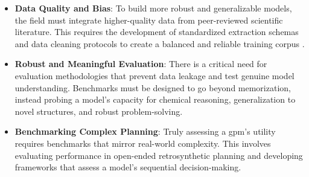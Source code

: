 \begin{itemize}
    \item \textbf{Data Quality and Bias}: To build more robust and generalizable models, the field must integrate higher-quality data from peer-reviewed scientific literature. This requires the development of standardized extraction schemas and data cleaning protocols to create a balanced and reliable training corpus \autocite{rios2025llm, mehr2020universal}.
    \item \textbf{Robust and Meaningful Evaluation}: There is a critical need for evaluation methodologies that prevent data leakage and test genuine model understanding. Benchmarks must be designed to go beyond memorization, instead probing a model's capacity for chemical reasoning, generalization to novel structures, and robust problem-solving.
    \item \textbf{Benchmarking Complex Planning}: Truly assessing a \gls{gpm}'s utility requires benchmarks that mirror real-world complexity. This involves evaluating performance in open-ended retrosynthetic planning and developing frameworks that assess a model's sequential decision-making.
\end{itemize}


